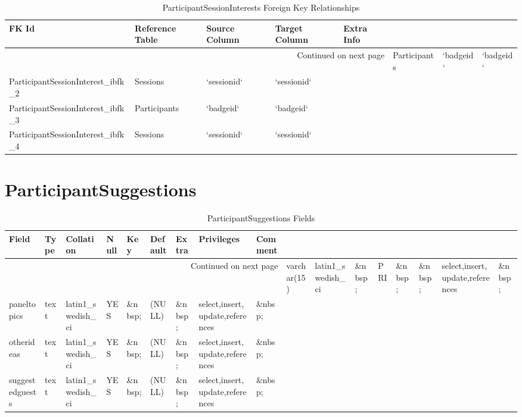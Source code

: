 \documentclass[tablesignature]{scrartcl}
\begin{document}
\begin{longtable}{|l|l|l|l|l|}
\caption{ParticipantSessionInterests Foreign Key Relationships} \label{tbl:participantsessioninterestsfkr}\\
\hline
 FK Id                                    &  Reference Table  &  Source Column  &  Target Column  &  Extra Info \\
\hline
\endhead
\hline\multicolumn{5}{r}{Continued on next page}\
\endfoot
\endlastfoot
\hline
 ParticipantSessionInterest\_{}ibfk\_{}1  &  Participants     &  `badgeid`      &  `badgeid`      &              \\
 ParticipantSessionInterest\_{}ibfk\_{}2  &  Sessions         &  `sessionid`    &  `sessionid`    &              \\
 ParticipantSessionInterest\_{}ibfk\_{}3  &  Participants     &  `badgeid`      &  `badgeid`      &              \\
 ParticipantSessionInterest\_{}ibfk\_{}4  &  Sessions         &  `sessionid`    &  `sessionid`    &              \\
\hline
\end{longtable}
\section{ParticipantSuggestions}
\label{sec-12}


\begin{longtable}{|l|l|l|l|l|l|l|l|l|}
\caption{ParticipantSuggestions Fields} \label{tbl:participantsuggestionsfields}\\
\hline
 Field            &  Type         &  Collation                &  Null     &  Key      &  Default  &  Extra    &  Privileges                       &  Comment \\
\hline
\endhead
\hline\multicolumn{9}{r}{Continued on next page}\
\endfoot
\endlastfoot
\hline
 badgeid          &  varchar(15)  &  latin1\_{}swedish\_{}ci  &  \&nbsp;  &  PRI      &  \&nbsp;  &  \&nbsp;  &  select,insert,update,references  &  \&nbsp;  \\
 paneltopics      &  text         &  latin1\_{}swedish\_{}ci  &  YES      &  \&nbsp;  &  (NULL)   &  \&nbsp;  &  select,insert,update,references  &  \&nbsp;  \\
 otherideas       &  text         &  latin1\_{}swedish\_{}ci  &  YES      &  \&nbsp;  &  (NULL)   &  \&nbsp;  &  select,insert,update,references  &  \&nbsp;  \\
 suggestedguests  &  text         &  latin1\_{}swedish\_{}ci  &  YES      &  \&nbsp;  &  (NULL)   &  \&nbsp;  &  select,insert,update,references  &  \&nbsp;  \\
\hline
\end{longtable}
\end{document}
